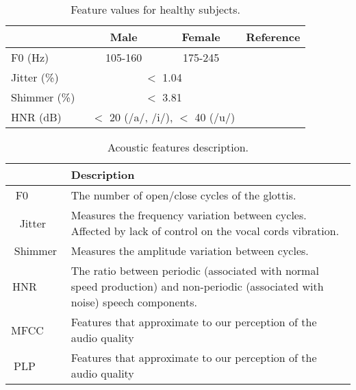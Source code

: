 \documentclass[doublespace,a4paper,11pt,twoside,onecolumn,final,openright]{thesis}
\begin{document}
\begin{table}[!htb]
	\renewcommand{\arraystretch}{1.3} %
	\centering
	\begin{tabular}{lccc}
		\hline
		~       & Male & Female & Reference \\ \hline
		F0 (Hz)      & 105-160 & 175-245 & \cite{f0_values}\\ 
		Jitter (\%)  & \multicolumn{2}{c}{ $<$ 1.04  } & \cite{jitter_shimmer_values} \\ 
		Shimmer (\%) & \multicolumn{2}{c}{ $<$ 3.81 } & \cite{jitter_shimmer_values} \\
		HNR (dB)     & \multicolumn{2}{c}{ $<$ 20 (/a/, /i/), $<$ 40 (/u/) } & \cite{hnr_values} \\
		\hline
	\end{tabular}
	\caption[Feature values for healthy subjects.]{Feature values for healthy subjects.}
	\label{normalValues}
\end{table}

\pagebreak

\begin{table}[!htb]
	\renewcommand{\arraystretch}{1.4} %
	\centering
	\begin{tabular}{cL}
		\hline
		~ & \textbf{Description} \\ \hline
		F0      & The number of open/close cycles of the glottis. \\ 
		Jitter  & Measures the frequency variation between cycles. Affected by lack of control on the vocal cords vibration. \\ 
		Shimmer & Measures the amplitude variation between cycles. \\ 
		HNR     & The ratio between periodic (associated with normal speed production) and non-periodic (associated with noise) speech components. \\ 
		MFCC    & Features that approximate to our perception of the audio quality \\ 
		PLP     & Features that approximate to our perception of the audio quality \\
		\hline
	\end{tabular}
	\caption[Acoustic features description.]{Acoustic features description.}
	\label{featureDescription}
\end{table}

\end{document}

